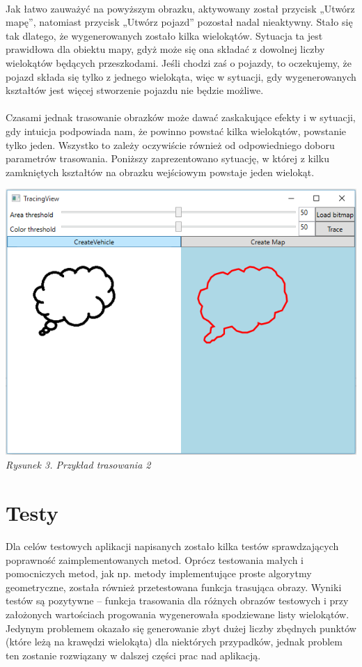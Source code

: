\documentclass{article}
\let\oldsection\section
\renewcommand\section{\clearpage\oldsection} %
\begin{document}
~\\Jak łatwo zauważyć na powyższym obrazku, aktywowany został przycisk „Utwórz mapę”, natomiast przycisk „Utwórz pojazd” pozostał nadal nieaktywny. Stało się tak dlatego, że wygenerowanych zostało kilka wielokątów. Sytuacja ta jest prawidłowa dla obiektu mapy, gdyż może się ona składać z dowolnej liczby wielokątów będących przeszkodami. Jeśli chodzi zaś o pojazdy, to oczekujemy, że pojazd składa się tylko z jednego wielokąta, więc w sytuacji, gdy wygenerowanych kształtów jest więcej stworzenie pojazdu nie będzie możliwe. 
\\\\Czasami jednak trasowanie obrazków może dawać zaskakujące efekty i w sytuacji, gdy intuicja podpowiada nam, że powinno powstać kilka wielokątów, powstanie tylko jeden. Wszystko to zależy oczywiście również od odpowiedniego doboru parametrów trasowania. Poniższy zaprezentowano  sytuację, w której z kilku zamkniętych kształtów na obrazku wejściowym powstaje jeden wielokąt.
~\\\begin{center}
	\includegraphics[scale=0.7]{tracingview3}\\
	\textit{Rysunek 3. Przykład trasowania 2}
\end{center}

\section{Testy}

Dla celów testowych aplikacji napisanych zostało kilka testów sprawdzających poprawność zaimplementowanych metod. Oprócz testowania małych i pomocniczych metod, jak np. metody implementujące proste algorytmy geometryczne, została również przetestowana funkcja trasująca obrazy. Wyniki testów są pozytywne – funkcja trasowania dla różnych obrazów testowych i przy założonych wartościach progowania wygenerowała spodziewane listy wielokątów. Jedynym problemem okazało się generowanie zbyt dużej liczby zbędnych punktów (które leżą na krawędzi wielokąta) dla niektórych przypadków, jednak problem ten zostanie rozwiązany w dalszej części prac nad aplikacją.
\end{document}
